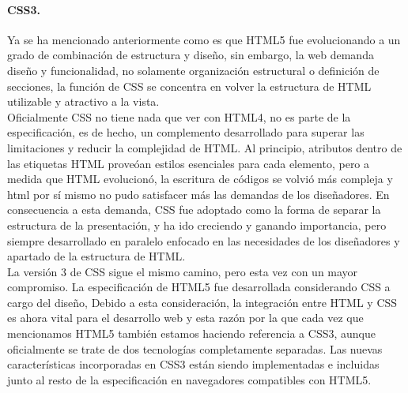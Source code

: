 \documentclass[12pt, a4paper, titlepage]{report}
\begin{document}
				\paragraph{CSS3.\\}
				Ya se ha mencionado anteriormente como es que HTML5 fue evolucionando a un grado de combinación de estructura y diseño, sin embargo, la web demanda diseño y funcionalidad, no solamente organización estructural o definición de secciones, la función de CSS se concentra en volver la estructura de HTML utilizable y atractivo a la vista.\\
				
				Oficialmente CSS no tiene nada que ver con HTML4, no es parte de la especificación, es de hecho, un complemento desarrollado para superar las limitaciones y reducir la complejidad de HTML. Al principio, atributos dentro de las etiquetas HTML proveóan estilos esenciales para cada elemento, pero a medida que HTML evolucionó, la escritura de códigos se volvió más compleja y html por sí mismo no pudo satisfacer más las demandas de los diseñadores. En consecuencia a esta demanda, CSS fue adoptado como la forma de separar la estructura de la presentación, y ha ido creciendo y ganando importancia, pero siempre desarrollado en paralelo enfocado en las necesidades de los diseñadores y apartado de la estructura de HTML.\\
				
				La versión 3 de CSS sigue el mismo camino, pero esta vez con un mayor compromiso. La especificación de HTML5 fue desarrollada considerando CSS a cargo del diseño, Debido a esta consideración, la integración entre HTML y CSS es ahora vital para el desarrollo web y esta razón por la que cada vez que mencionamos HTML5 también estamos haciendo referencia a CSS3, aunque oficialmente se trate de dos tecnologías completamente separadas. Las nuevas características incorporadas en CSS3 están siendo implementadas e incluidas junto al resto de la especificación en navegadores compatibles con HTML5. 
				\cite{refElGranLibro}%
				
\end{document}
